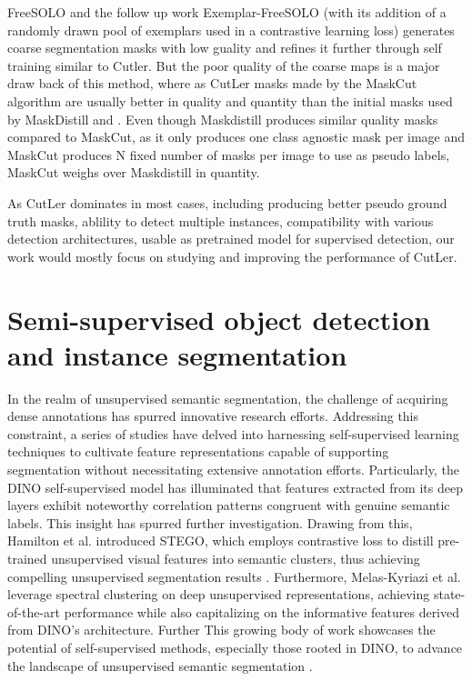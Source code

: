 FreeSOLO\cite{wang2022freesolo} and the follow up work Exemplar-FreeSOLO\cite{Ishtiak_2023_CVPR} (with its addition of a randomly drawn pool of exemplars used in a contrastive learning loss) generates coarse segmentation masks with low guality and refines it further through self training similar to Cutler. But the poor quality of the coarse maps is a major draw back of this method, where as CutLer masks made by the MaskCut\cite{wang2023cut, wang2022tokencut} algorithm are usually better in quality and quantity than the initial masks used by MaskDistill\cite{vangansbeke2022discovering} and \cite{wang2022freesolo}. Even though Maskdistill produces similar quality masks compared to MaskCut, as it only produces one class agnostic mask per image and MaskCut produces N fixed number of masks per image to use as pseudo labels, MaskCut weighs over Maskdistill in quantity.

As CutLer dominates in most cases, including producing better pseudo ground truth masks, ablility to detect multiple instances, compatibility with various detection architectures, usable as pretrained model for supervised detection, our work would mostly focus on studying and improving the performance of CutLer.

\section{Semi-supervised object detection and instance segmentation}
In the realm of unsupervised semantic segmentation, the challenge of acquiring dense annotations has spurred innovative research efforts. Addressing this constraint, a series of studies \cite{hwang2019segsort,melas2022deep,cho2021picie,wang2022tokencut,hamilton2022unsupervised} have delved into harnessing self-supervised learning techniques to cultivate feature representations capable of supporting segmentation without necessitating extensive annotation efforts. Particularly, the DINO self-supervised model has illuminated that features extracted from its deep layers exhibit noteworthy correlation patterns congruent with genuine semantic labels. This insight has spurred further investigation. Drawing from this, Hamilton et al. introduced STEGO, which employs contrastive loss to distill pre-trained unsupervised visual features into semantic clusters, thus achieving compelling unsupervised segmentation results \cite{hamilton2022unsupervised}. Furthermore, Melas-Kyriazi et al. leverage spectral clustering on deep unsupervised representations, achieving state-of-the-art performance while also capitalizing on the informative features derived from DINO's architecture. Further This growing body of work showcases the potential of self-supervised methods, especially those rooted in DINO, to advance the landscape of unsupervised semantic segmentation \cite{melas2022deep}.

